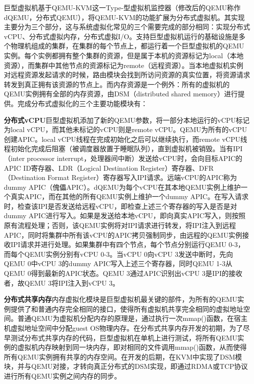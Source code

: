 巨型虚拟机基于QEMU-KVM这一Type-\uppercase\expandafter{}型虚拟机监控器（修改后的QEMU称作dQEMU，分布式QEMU），将QEMU-KVM的功能扩展为分布式虚拟机。其实现主要分为三个部分，这与系统虚拟化常见的三个需要完成的部分相同：实现分布式vCPU、分布式虚拟内存，分布式虚拟I/O。支持巨型虚拟机运行的基础设施是多个物理机组成的集群，在集群的每个节点上，都运行着一个巨型虚拟机的QEMU实例。每个实例都拥有整个集群的资源，但是属于本机的资源标记为local（本地资源），而集群中其他节点的资源标记为remote（远程资源）。当本地虚拟机实例对远程资源发起请求的时候，路由模块会找到所访问资源的真实位置，将资源请求转发到真正拥有该资源的节点上。而内存资源是一个例外：所有的虚拟机的QEMU实例拥有全部的内存资源，由DSM（distributed shared memory）进行提供。完成分布式虚拟化的三个主要功能模块有：


\noindent\textbf{分布式vCPU}\quad 巨型虚拟机添加了新的QEMU参数，将一部分本地运行的vCPU标记为local vCPU，而其他未标记的vCPU则是remote vCPU。QEMU为所有的vCPU创建APIC。local vCPU线程在完成初始化之后可以继续执行，而remote vCPU线程初始化完成后阻塞（被调度器放置于睡眠队列），直到虚拟机被销毁。当有IPI（inter processor interrupt，处理器间中断）发送给vCPU时，会向目标APIC的APIC ID寄存器、LDR（Logical Destination Register）寄存器、DFR（Destination Format Register）寄存器写入IPI请求。远端vCPU的APIC称为dummy APIC（傀儡APIC）。dQEMU为每个vCPU在其本地QEMU实例上维护一个真实APIC，而在其他的所有QEMU实例上维护一个dummy APIC。在写入请求时，检查该IPI是否发送给远程vCPU，即检查上述三个寄存器的写入是否是对dummy APIC进行写入。如果是发送给本地vCPU，即向真实APIC写入，则按照原有流程处理；否则，该QEMU实例将对IPI请求进行转发，将IPI注入到远程APIC，同时将集群中所有该vCPU的APIC拷贝强制同步，由远程的QEMU实例接收IPI请求并进行处理。如果集群中有四个节点，每个节点分别运行QEMU 0-3，而每个QEMU实例分别有vCPU 0-3。当vCPU 0向vCPU 3发送中断时，先向QEMU 0中vCPU 3的dummy APIC写入上述三个寄存器，同时QEMU 1-3从QEMU 0得到最新的APIC状态。QEMU 3通过APIC识别出vCPU 3是IPI的接收者，故QEMU 3将IPI注入到vCPU 3。

\noindent\textbf{分布式共享内存}\quad 内存虚拟化模块是巨型虚拟机最关键的部件，为所有的QEMU实例提供了和普通内存完全相同的接口，使得所有虚拟机共享完全相同的虚拟地址空间。普通QEMU为虚拟机分配内存的原理是，通过执行一次mmap()函数，在宿主机虚拟地址空间中分配guest OS物理内存。在分布式共享内存开发的初期，为了尽早测试分布式共享内存的代码，巨型虚拟机在单机上进行测试，将所有QEMU实例的虚拟机内存映射到同一块内存，即对相同的文件调用mmap()函数，从而使得所有QEMU实例拥有共享的内存空间。在开发的后期，在KVM中实现了DSM模块，并与QEMU对接，才转向真正分布式的DSM实现，即通过RDMA或TCP协议进行所有QEMU实例之间内存的同步。

